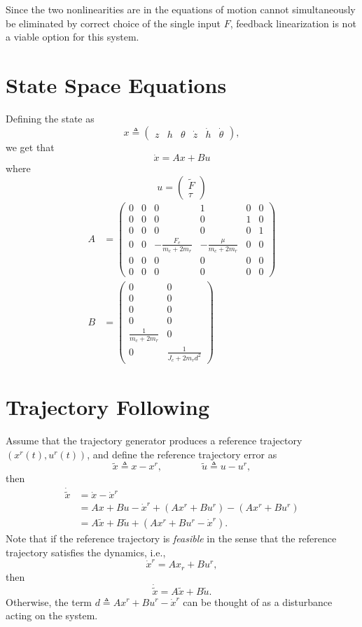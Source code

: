 \documentclass{article}
\begin{document}
Since the two nonlinearities are in the equations of motion cannot simultaneously be eliminated by correct choice of the single input $F$, feedback linearization is not a viable option for this system.


\section{State Space Equations}

Defining the state as
\[
x \triangleq \begin{pmatrix} z & h & \theta & \dot{z} & \dot{h} & \dot{\theta} \end{pmatrix}, 
\]
we get that
\[
\dot{x} = Ax + Bu
\]
where
\[
u = \begin{pmatrix} \tilde{F} \\ \tau \end{pmatrix}
\]
\begin{align*}
A &= \begin{pmatrix}
	0 & 0 & 0 & 1 & 0 & 0 \\
	0 & 0 & 0 & 0 & 1 & 0 \\
	0 & 0 & 0 & 0 & 0 & 1 \\
	0 & 0 & -\frac{F_e}{m_c+2m_r} & -\frac{\mu}{m_c+2m_r} & 0 & 0 \\
	0 & 0 & 0 & 0 & 0 & 0 \\
	0 & 0 & 0 & 0 & 0 & 0 
 	\end{pmatrix} \\
 B &= \begin{pmatrix}
 		0 & 0 \\
 		0 & 0 \\
 		0 & 0 \\
 		0 & 0 \\
 		\frac{1}{m_c+2m_r} & 0 \\
 		0 & \frac{1}{J_c+2m_rd^2}
 	  \end{pmatrix}
\end{align*}


\section{Trajectory Following}

Assume that the trajectory generator produces a reference trajectory $(x^r(t), u^r(t))$, and define the reference trajectory error as
\[
\tilde{x}\triangleq x - x^r, \qquad\qquad \tilde{u}\triangleq u-u^r,
\]
then
\begin{align*}
\dot{\tilde{x}} &= \dot{x} - \dot{x}^r \\
				&= Ax + Bu - \dot{x}^r + (Ax^r + Bu^r) - (Ax^r+Bu^r) \\
				&= A\tilde{x} + B\tilde{u} + (Ax^r + Bu^r - \dot{x}^r).
\end{align*}
Note that if the reference trajectory is {\em feasible} in the sense that the reference trajectory 
satisfies the dynamics, i.e., 
\[
\dot{x}^r = A x_r + B u^r,
\]
then
\[
\dot{\tilde{x}} = A\tilde{x} + B\tilde{u}.
\]
Otherwise, the term $d\triangleq Ax^r + Bu^r - \dot{x}^r$ can be thought of as a disturbance acting on the system.
\end{document}
